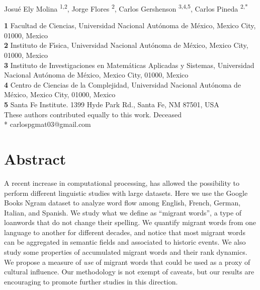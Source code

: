 \documentclass[10pt,letterpaper]{article} %
\begin{document}
\vspace*{0.2in}

\begin{flushleft}
{\Large
	\textbf{} %
}
\newline
Josué Ely Molina  \ddag\textsuperscript{1,2}, %
Jorge Flores      \dag \textsuperscript{2}, %
Carlos Gershenson \textsuperscript{3,4,5},
Carlos Pineda     \ddag\textsuperscript{2,*}    %
% 


\bigskip
\newcommand{\unam}{Universidad Nacional Aut\'{o}noma de M\'{e}xico, Mexico City, 01000, Mexico}
\textbf{1} Facultad de Ciencias, \unam \\
\textbf{2} Instituto de F\'{\i}sica, \unam \\
\textbf{3} Instituto de Investigaciones en Matem\'{a}ticas Aplicadas y Sistemas, \unam \\
\textbf{4} Centro de Ciencias de la Complejidad, \unam \\
\textbf{5} Santa Fe Institute. 1399 Hyde Park Rd., Santa Fe, NM 87501, USA\\
\bigskip
\ddag These authors contributed equally to this work.
\dag Deceased \\
* carlospgmat03@gmail.com
\end{flushleft}
\section*{Abstract} %

A recent increase in computational processing, has allowed the possibility to perform different linguistic studies with large datasets. Here we use the Google Books Ngram dataset to analyze word flow among English, French, German, Italian, and Spanish. We study what we define as ``migrant words'', a type of loanwords that do not change their spelling. We quantify migrant words from one language to another for different decades, and notice that most migrant words can be aggregated in semantic fields and associated to historic events. We also study some properties of accumulated migrant words and their rank dynamics. We propose a measure of \emph{use} of migrant words that could be used as a proxy of cultural influence. Our methodology is not exempt of caveats, but our results are encouraging to promote further studies in this direction.
\end{document}
